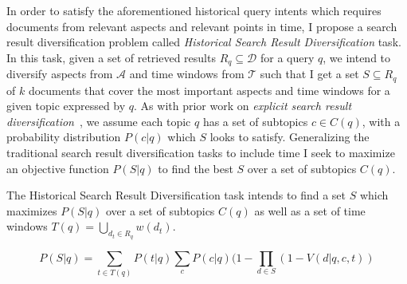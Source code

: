 


In order to satisfy the aforementioned historical query intents which requires documents from relevant aspects and relevant points in time, I propose a search result diversification problem called \emph{Historical Search Result Diversification} task. In this task, given a set of retrieved results $R_q \subseteq \mathcal{D}$ for a query $q$, we intend to diversify aspects from $\mathcal{A}$ and time windows from $\mathcal{T}$ such that I get a set $S \subseteq R_q$ of $k$ documents that cover the most important aspects and time windows for a given topic expressed by $q$. As with prior work on \emph{explicit search result diversification}~\cite{agrawal_diversifying_2009}, we assume each topic $q$ has a set of subtopics $c \in C(q)$, with a probability distribution $P(c|q)$ which $S$ looks to satisfy. Generalizing the traditional search result diversification tasks to include time I seek to maximize an objective function $P(S|q)$ to find the best $S$ over a set of subtopics $C(q)$. 






\begin{definition} The Historical Search Result Diversification task intends to find a set $S$ which maximizes $P(S|q)$ over a set of subtopics $C(q)$ as well as a set of time windows $T(q) = \bigcup_{d_t \in R_q}{w(d_t)}$.

\begin{equation}
P(S|q) = \sum_{t \in T(q)} P(t|q) \sum_c P(c|q)(1-\prod_{d \in S}(1-V(d|q,c,t))
\end{equation}
\end{definition}


